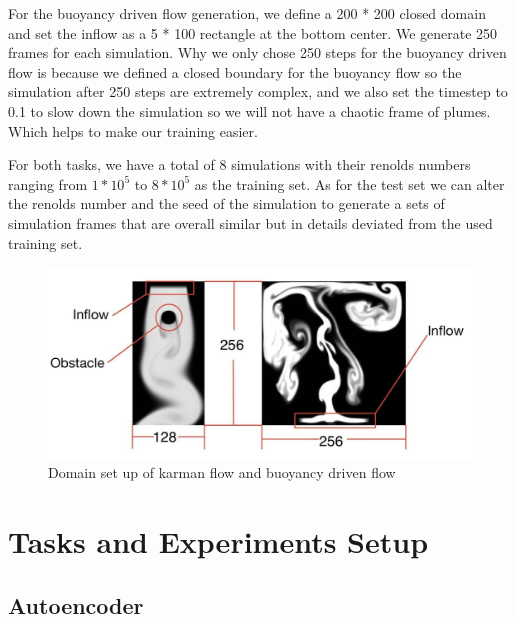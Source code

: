 \documentclass[a4paper,12pt,twoside]{report}
\begin{document}
For the buoyancy driven flow generation, we define a 200 * 200 closed domain and set the inflow as a 5 * 100 rectangle at the bottom center. We generate 250 frames for each simulation. Why we only chose 250 steps for the buoyancy driven flow is because we defined a closed boundary for the buoyancy flow so the simulation after 250 steps are extremely complex, and we also set the timestep to 0.1 to slow down the simulation so we will not have a chaotic frame of plumes. Which helps to make our training easier.

For both tasks, we have a total of 8 simulations with their renolds numbers ranging from $1*10^5$ to $8*10^5$ as the training set. As for the test set we can alter the renolds number and the seed of the simulation to generate a sets of simulation frames that are overall similar but in details deviated from the used training set. 
\begin{figure}
	\centering
	\includegraphics[width=1.0\textwidth]{domaindescription.jpg}
	\caption{Domain set up of karman flow and buoyancy driven flow}
\end{figure}







\chapter{Tasks and Experiments Setup}

\section{Autoencoder}
\end{document}
